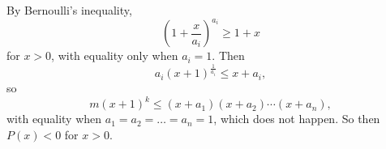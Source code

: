 By Bernoulli's inequality, \[\left(1+\frac{x}{a_i}\right)^{a_i}\geq1+x\] for $x>0$, with equality only when $a_i=1$. Then \[a_i\left(x+1\right)^{\frac{1}{a_i}}\leq x+a_i,\] so \[m\left(x+1\right)^k\leq\left(x+a_1\right)\left(x+a_2\right)\cdots\left(x+a_n\right),\] with equality when $a_1=a_2=\ldots=a_n=1$, which does not happen. So then $P\left(x\right)<0$ for $x>0$.